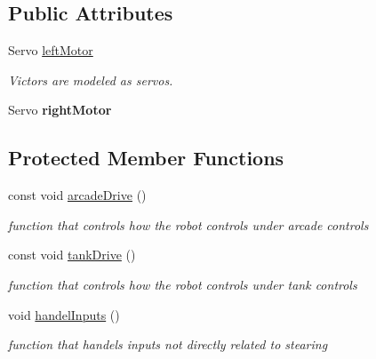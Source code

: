 \subsection*{Public Attributes}
\begin{DoxyCompactItemize}
\item 
\mbox{\label{class_basic_drive_controller_ab4ce25ed989afe71a4e3c7a07a3fef6f}} 
Servo \mbox{\hyperlink{class_basic_drive_controller_ab4ce25ed989afe71a4e3c7a07a3fef6f}{left\+Motor}}
\begin{DoxyCompactList}\small\item\em Victors are modeled as servos. \end{DoxyCompactList}\item 
\mbox{\label{class_basic_drive_controller_ac57b8a3975bf62d191ff047a7cb21427}} 
Servo {\bfseries right\+Motor}
\end{DoxyCompactItemize}
\subsection*{Protected Member Functions}
\begin{DoxyCompactItemize}
\item 
\mbox{\label{class_basic_drive_controller_ae934462a6e905bd1660cdf6c307d779e}} 
const void \mbox{\hyperlink{class_basic_drive_controller_ae934462a6e905bd1660cdf6c307d779e}{arcade\+Drive}} ()
\begin{DoxyCompactList}\small\item\em function that controls how the robot controls under arcade controls \end{DoxyCompactList}\item 
\mbox{\label{class_basic_drive_controller_ac454ab3b1872cc84138f29c4574680ef}} 
const void \mbox{\hyperlink{class_basic_drive_controller_ac454ab3b1872cc84138f29c4574680ef}{tank\+Drive}} ()
\begin{DoxyCompactList}\small\item\em function that controls how the robot controls under tank controls \end{DoxyCompactList}\item 
\mbox{\label{class_basic_drive_controller_a6c5c51282655efdf990d6d01f7a36449}} 
void \mbox{\hyperlink{class_basic_drive_controller_a6c5c51282655efdf990d6d01f7a36449}{handel\+Inputs}} ()
\begin{DoxyCompactList}\small\item\em function that handels inputs not directly related to stearing \end{DoxyCompactList}\end{DoxyCompactItemize}
